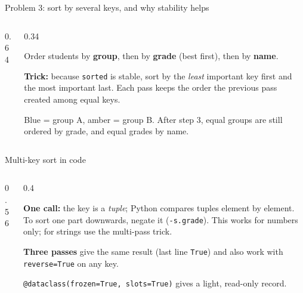 \documentclass[aspectratio=169,10pt]{beamer}
\begin{document}
\begin{frame}{Problem 3: sort by several keys, and why stability helps}
\begin{columns}[T]
\begin{column}{0.64\textwidth}
\begin{sfig}[0.82]
\begin{tikzpicture}
  
\end{tikzpicture}
\end{sfig}
\end{column}
\begin{column}{0.34\textwidth}
{\small
Order students by \textbf{group}, then by \textbf{grade} (best first), then by \textbf{name}.

\vspace{2mm}
\textbf{Trick:} because \texttt{sorted} is stable, sort by the \emph{least} important key first and the most important last. Each pass keeps the order the previous pass created among equal keys.

\vspace{2mm}
Blue = group A, amber = group B. After step 3, equal groups are still ordered by grade, and equal grades by name.}
\end{column}
\end{columns}
\end{frame}

\begin{frame}{Multi-key sort in code}
\begin{columns}[T]
\begin{column}{0.56\textwidth}
\end{column}
\begin{column}{0.4\textwidth}
\vspace{2mm}
{\small
\textbf{One call:} the key is a \emph{tuple}; Python compares tuples element by element. To sort one part downwards, negate it (\texttt{-s.grade}). This works for numbers only; for strings use the multi-pass trick.

\vspace{2mm}
\textbf{Three passes} give the same result (last line \texttt{True}) and also work with \texttt{reverse=True} on any key.

\vspace{2mm}
\texttt{@dataclass(frozen=True, slots=True)} gives a light, read-only record.}
\end{column}
\end{columns}
\end{frame}
\end{document}

